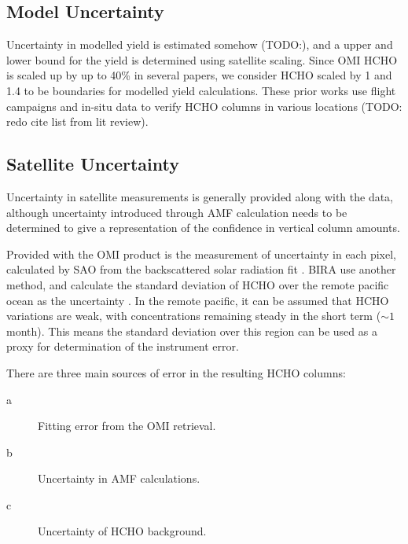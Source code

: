   \subsection{Model Uncertainty}
    \label{Model:Uncertainty:Model}
    Uncertainty in modelled yield is estimated somehow (TODO:), and a upper and lower bound for the yield is determined using satellite scaling.
    Since OMI HCHO is scaled up by up to 40\% in several papers, we consider HCHO scaled by 1 and 1.4 to be boundaries for modelled yield calculations.
    These prior works use flight campaigns and in-situ data to verify HCHO columns in various locations (TODO: redo cite list from lit review).
    
    
    
  \subsection{Satellite Uncertainty}
    \label{BioIsop:Uncertianty:Satellite}
    
    Uncertainty in satellite measurements is generally provided along with the data, although uncertainty introduced through AMF calculation needs to be determined to give a representation of the confidence in vertical column amounts.
    
    Provided with the OMI product is the measurement of uncertainty in each pixel, calculated by SAO from the backscattered solar radiation fit \parencite{Abad2015,Abad2016}.
    BIRA use another method, and calculate the standard deviation of HCHO over the remote pacific ocean as the uncertainty \parencite{DeSmedt2012, DeSmedt2015}.
    In the remote pacific, it can be assumed that HCHO variations are weak, with concentrations remaining steady in the short term ($\sim 1$ month).
    This means the standard deviation over this region can be used as a proxy for determination of the instrument error.
    
    There are three main sources of error in the resulting HCHO columns:
    \begin{description}
      \item[a] Fitting error from the OMI retrieval.
      \item[b] Uncertainty in AMF calculations.
      \item[c] Uncertainty of HCHO background.
    \end{description}
    
